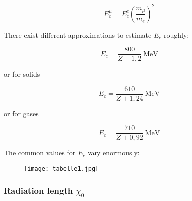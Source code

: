 \[E_c^\mu = E_c^e \left( \frac{m_\mu}{m_e} \right)^2 \]

There exist different approximations to estimate $E_c$ roughly:

\[E_c = \frac{800}{Z+1{},2}~\text{MeV} \]

or for solids

\[E_c = \frac{610}{Z+1{,}24}~\text{MeV} \]

or for gases

\[E_c = \frac{710}{Z+0{,}92}~\text{MeV} \]

The common values for $E_c$ vary enormously:

\begin{figure}[H]
	\centering
	\texttt{[image: tabelle1.jpg]}
	\caption{}
	\label{}
\end{figure}


\subsubsection*{Radiation length $\chi_0$}


